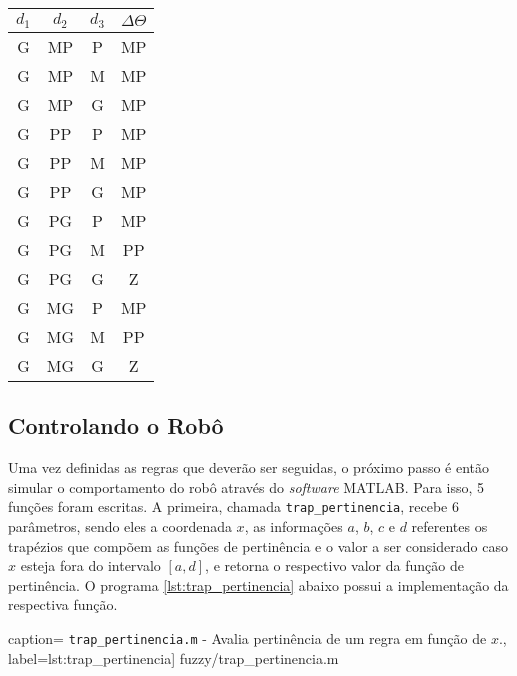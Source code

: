 \begin{table}[H]
\begin{minipage}{0.30\textwidth}
\begin{tabular}{| c | c | c | c |}
						\end{tabular}	
					\end{minipage}	
					\begin{minipage}{0.30\textwidth}
					    \centering
						\begin{tabular}{| c | c | c | c |} 
						\hline
						\(d_1\) & \(d_2\) & \(d_3\) & \(\Delta \Theta\) \\ \hline
						G & MP & P & MP \\ \hline
						G & MP & M & MP \\ \hline
						G & MP & G & MP \\ \hline
						G & PP & P & MP \\ \hline
						G & PP & M & MP \\ \hline
						G & PP & G & MP  \\ \hline 	  	 
						G & PG & P & MP \\ \hline
						G & PG & M & PP \\ \hline
						G & PG & G & Z  \\ \hline
						G & MG & P & MP \\ \hline
						G & MG & M & PP \\ \hline
						G & MG & G & Z  \\ \hline
						\end{tabular}	
					\end{minipage}	      
			    \end{table}
	\FloatBarrier
	
	\subsection{Controlando o Robô}
	
	Uma vez definidas as regras que deverão ser seguidas, o próximo passo é então
	simular o comportamento do robô através do \textit{software} MATLAB. Para isso,
	5 funções foram escritas. A primeira, chamada \texttt{trap\_pertinencia},
	recebe 6 parâmetros, sendo eles a coordenada \(x\), as informações \(a\), \(b\), \(c\)
	e \(d\) referentes os trapézios que compõem as funções de pertinência e o valor
	a ser considerado caso \(x\) esteja fora do intervalo \(\left[a, d\right]\), e
	retorna o respectivo valor da função de pertinência. O programa
	\ref{lst:trap_pertinencia} abaixo possui a implementação da respectiva
	função.
	
	 caption={ \texttt{trap\_pertinencia.m} -
	Avalia pertinência de um regra em função de \(x\).},
	label={lst:trap_pertinencia}] {fuzzy/trap_pertinencia.m}
	
